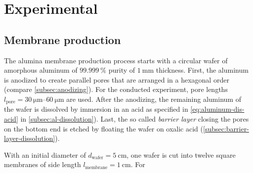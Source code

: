 \documentclass[../thesis.tex]{subfiles}
\begin{document}
  \chapter{Experimental}
  \label{ch:experimental}

    \section{Membrane production}
    \label{sec:membrane-production}

      The alumina membrane production process starts with a circular wafer of amorphous aluminum of $\SI{99,999}{\percent}$ purity of $\SI{1}{\milli\meter}$ thickness. First, the aluminum is anodized to create parallel pores that are arranged in a hexagonal order (compare \cref{subsec:anodizing}). For the conducted experiment, pore lengths $l_\mathrm{pore}=\SIrange{30}{60}{\micro\meter}$ are used. After the anodizing, the remaining aluminum of the wafer is dissolved by immersion in an acid as specified in \cref{eq:aluminum-dis-acid} in \cref{subsec:al-dissolution}). Last, the so called \textit{barrier layer} closing the pores on the bottom end is etched by floating the wafer on oxalic acid (\cref{subsec:barrier-layer-dissolution}).

      With an initial diameter of $d_\mathrm{wafer}=\SI{5}{\centi\meter}$, one wafer is cut into twelve square membranes of side length $l_\mathrm{membrane}=\SI{1}{\centi\meter}$. For 
\end{document}

